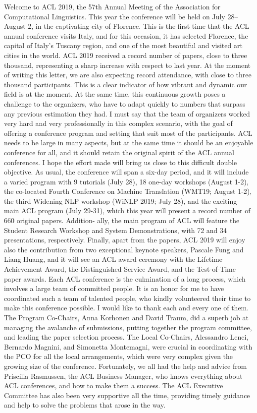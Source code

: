 Welcome to ACL 2019, the 57th Annual Meeting of the Association for Computational Linguistics. This year the conference will be held on July 28–August 2, in the captivating city of Florence. This is the first time that the ACL annual conference visits Italy, and for this occasion, it has selected Florence, the capital of Italy’s Tuscany region, and one of the most beautiful and visited art cities in the world.
ACL 2019 received a record number of papers, close to three thousand, representing a sharp increase with respect to last year. At the moment of writing this letter, we are also expecting record attendance, with close to three thousand participants. This is a clear indicator of how vibrant and dynamic our field is at the moment. At the same time, this continuous growth poses a challenge to the organizers, who have to adapt quickly to numbers that surpass any previous estimation they had. I must say that the team of organizers worked very hard and very professionally in this complex scenario, with the goal of offering a conference program and setting that suit most of the participants. ACL needs to be large in many aspects, but at the same time it should be an enjoyable conference for all, and it should retain the original spirit of the ACL annual conferences. I hope the effort made will bring us close to this difficult double objective.
As usual, the conference will span a six-day period, and it will include a varied program with 9 tutorials (July 28), 18 one-day workshops (August 1-2), the co-located Fourth Conference on Machine Translation (WMT19; August 1-2), the third Widening NLP workshop (WiNLP 2019; July 28), and the exciting main ACL program (July 29-31), which this year will present a record number of 660 original papers. Addition- ally, the main program of ACL will feature the Student Research Workshop and System Demonstrations, with 72 and 34 presentations, respectively. Finally, apart from the papers, ACL 2019 will enjoy also the contribution from two exceptional keynote speakers, Pascale Fung and Liang Huang, and it will see an ACL award ceremony with the Lifetime Achievement Award, the Distinguished Service Award, and the Test-of-Time paper awards.
Each ACL conference is the culmination of a long process, which involves a large team of committed people. It is an honor for me to have coordinated such a team of talented people, who kindly volunteered their time to make this conference possible. I would like to thank each and every one of them. The Program Co-Chairs, Anna Korhonen and David Traum, did a superb job at managing the avalanche of submissions, putting together the program committee, and leading the paper selection process. The Local Co-Chairs, Alessandro Lenci, Bernardo Magnini, and Simonetta Montemagni, were crucial in coordinating with the PCO for all the local arrangements, which were very complex given the growing size of the conference. Fortunately, we all had the help and advice from Priscilla Rasmussen, the ACL Business Manager, who knows everything about ACL conferences, and how to make them a success. The ACL Executive Committee has also been very supportive all the time, providing timely guidance and help to solve the problems that arose in the way.
